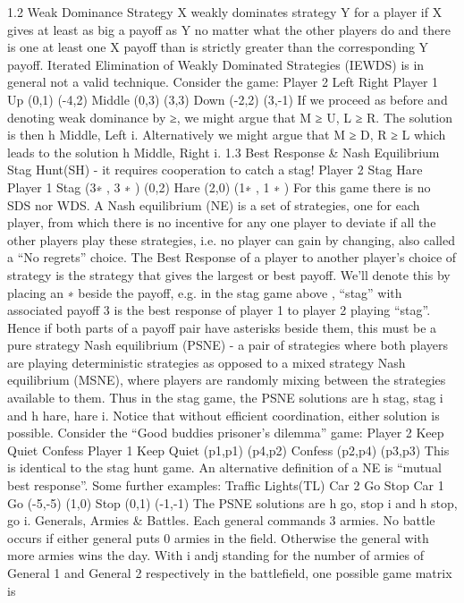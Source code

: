 1.2 Weak Dominance
Strategy X weakly dominates strategy Y for a player if X gives at least as big a payoff as Y
no matter what the other players do and there is one at least one X payoff than is strictly
greater than the corresponding Y payoff.
Iterated Elimination of Weakly Dominated Strategies (IEWDS) is in general not
a valid technique. Consider the game:
Player 2
Left Right
Player 1
Up (0,1) (-4,2)
Middle (0,3) (3,3)
Down (-2,2) (3,-1)
If we proceed as before and denoting weak dominance by ≥, we might argue that M ≥
U, L ≥ R. The solution is then h Middle, Left i. Alternatively we might argue that M ≥
D, R ≥ L which leads to the solution h Middle, Right i.
1.3 Best Response & Nash Equilibrium
Stag Hunt(SH) - it requires cooperation to catch a stag!
Player 2
Stag Hare
Player 1 Stag (3∗
, 3
∗
) (0,2)
Hare (2,0) (1∗
, 1
∗
)
For this game there is no SDS nor WDS.
A Nash equilibrium (NE) is a set of strategies, one for each player, from which there
is no incentive for any one player to deviate if all the other players play these strategies,
i.e. no player can gain by changing, also called a “No regrets” choice. The Best Response
of a player to another player’s choice of strategy is the strategy that gives the largest or
best payoff. We’ll denote this by placing an ∗ beside the payoff, e.g. in the stag game
above , “stag” with associated payoff 3 is the best response of player 1 to player 2 playing
“stag”. Hence if both parts of a payoff pair have asterisks beside them, this must be a pure
strategy Nash equilibrium (PSNE) - a pair of strategies where both players are playing
deterministic strategies as opposed to a mixed strategy Nash equilibrium (MSNE), where
players are randomly mixing between the strategies available to them.
Thus in the stag game, the PSNE solutions are h stag, stag i and h hare, hare i. Notice
that without efficient coordination, either solution is possible.
Consider the “Good buddies prisoner’s dilemma” game:
Player 2
Keep Quiet Confess
Player 1 Keep Quiet (p1,p1) (p4,p2)
Confess (p2,p4) (p3,p3)
This is identical to the stag hunt game.
An alternative definition of a NE is “mutual best response”. Some further examples:
Traffic Lights(TL)
Car 2
Go Stop
Car 1 Go (-5,-5) (1,0)
Stop (0,1) (-1,-1)
The PSNE solutions are h go, stop i and h stop, go i.
Generals, Armies & Battles. Each general commands 3 armies. No battle occurs if either
general puts 0 armies in the field. Otherwise the general with more armies wins the day.
With i andj standing for the number of armies of General 1 and General 2 respectively
in the battlefield, one possible game matrix is

